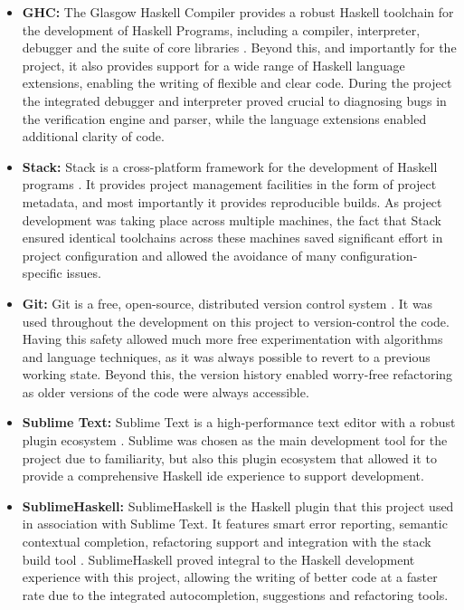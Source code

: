 \begin{itemize}
    \item \textbf{GHC:} The Glasgow Haskell Compiler provides a robust Haskell toolchain for the development of Haskell Programs, including a compiler, interpreter, debugger and the suite of core libraries \citep{ghc}. 
    Beyond this, and importantly for the project, it also provides support for a wide range of Haskell language extensions, enabling the writing of flexible and clear code.
    During the project the integrated debugger and interpreter proved crucial to diagnosing bugs in the verification engine and parser, while the language extensions enabled additional clarity of code.
    \item \textbf{Stack:} Stack is a cross-platform framework for the development of Haskell programs \citep{haskellstack}.
    It provides project management facilities in the form of project metadata, and most importantly it provides reproducible builds. 
    As project development was taking place across multiple machines, the fact that Stack ensured identical toolchains across these machines saved significant effort in project configuration and allowed the avoidance of many configuration-specific issues. 
    \item \textbf{Git:} Git is a free, open-source, distributed version control system \citep{git_scm}. 
    It was used throughout the development on this project to version-control the code.
    Having this safety allowed much more free experimentation with algorithms and language techniques, as it was always possible to revert to a previous working state. 
    Beyond this, the version history enabled worry-free refactoring as older versions of the code were always accessible. 
    \item \textbf{Sublime Text:} Sublime Text is a high-performance text editor with a robust plugin ecosystem \citep{sublime_text}.
    Sublime was chosen as the main development tool for the project due to familiarity, but also this plugin ecosystem that allowed it to provide a comprehensive Haskell \gls{ide} experience to support development.
    \item \textbf{SublimeHaskell:} SublimeHaskell is the Haskell plugin that this project used in association with Sublime Text. 
    It features smart error reporting, semantic contextual completion, refactoring support and integration with the stack build tool \citep{sublime_haskell}. 
    SublimeHaskell proved integral to the Haskell development experience with this project, allowing the writing of better code at a faster rate due to the integrated autocompletion, suggestions and refactoring tools. 
\end{itemize}

